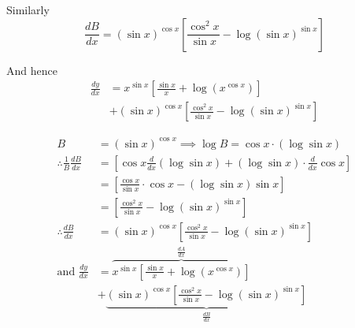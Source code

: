 \documentclass[14pt,fleqn]{extarticle}
\newcommand\fa{x^{\sin x}}
\newcommand\sa{\left(\sin x \right)^{\cos x}}
\begin{document}
	\newcard 
	
	Similarly 
	\[ \frac{dB}{dx} = \sa \left[\frac{\cos^2 x}{\sin x} - \log \left(\sin x \right)^{\sin x} \right]\] 
	
	And hence 
	\begin{align}
	\frac{dy}{dx} &= \fa \left[\frac{\sin x}{x} + \log \left(x^{\cos x} \right)\right] \\
	&+ \sa \left[\frac{\cos^2 x}{\sin x} - \log \left(\sin x \right)^{\sin x} \right]
\end{align}
	
	\newcard 
	
	\begin{align}
	   B &= \sa \implies \log B = \cos x\cdot \left(\log \sin x \right) \\
	   \therefore \frac{1}{B}\frac{dB}{dx} &= \left[\cos x \frac{d}{dx} \left(\log\sin x \right) + \left(\log \sin x \right)\cdot \frac{d}{dx}\cos x  \right] \\
	   &= \left[\frac{\cos x}{\sin x}\cdot \cos x - \left(\log \sin x \right)\sin x \right] \\
	   &= \left[\frac{\cos^2 x}{\sin x} - \log \left(\sin x \right)^{\sin x}\right] \\
	   \therefore \frac{dB}{dx} &= \sa \left[\frac{\cos^2 x}{\sin x} - \log \left(\sin x \right)^{\sin x}\right] \\
	   \text{and } \frac{dy}{dx} &= \overbrace{\fa \left[\frac{\sin x}{x} + \log \left(x^{\cos x} \right)\right]}^{\frac{dA}{dx}} \\
	&+ \underbrace{\sa \left[\frac{\cos^2 x}{\sin x} - \log \left(\sin x \right)^{\sin x} \right]}_{\frac{dB}{dx}}
\end{align}
\end{document}
